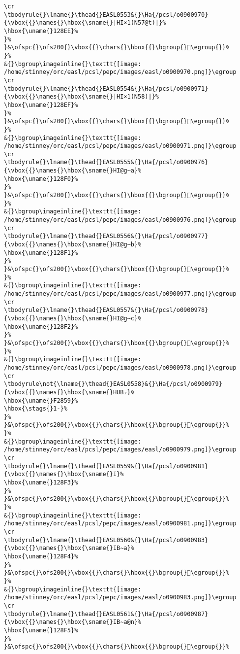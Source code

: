 \begin{verbatim}
\cr
\tbodyrule{}\lname{}\thead{}EASL0553&{}\Ha{/pcsl/o0900970}{\vbox{{}\names{}\hbox{\sname{}|HI×1(N57@t)|}%
\hbox{\uname{}128EE}%
}%
}&\ofspc{}\ofs200{}\vbox{{}\chars{}\hbox{{}\bgroup{}𒣮\egroup{}}%
}%
&{}\bgroup\imageinline{}\texttt{[image: /home/stinney/orc/easl/pcsl/pepc/images/easl/o0900970.png]}\egroup
\cr
\tbodyrule{}\lname{}\thead{}EASL0554&{}\Ha{/pcsl/o0900971}{\vbox{{}\names{}\hbox{\sname{}|HI×1(N58)|}%
\hbox{\uname{}128EF}%
}%
}&\ofspc{}\ofs200{}\vbox{{}\chars{}\hbox{{}\bgroup{}𒣯\egroup{}}%
}%
&{}\bgroup\imageinline{}\texttt{[image: /home/stinney/orc/easl/pcsl/pepc/images/easl/o0900971.png]}\egroup
\cr
\tbodyrule{}\lname{}\thead{}EASL0555&{}\Ha{/pcsl/o0900976}{\vbox{{}\names{}\hbox{\sname{}HI@g∼a}%
\hbox{\uname{}128F0}%
}%
}&\ofspc{}\ofs200{}\vbox{{}\chars{}\hbox{{}\bgroup{}𒣰\egroup{}}%
}%
&{}\bgroup\imageinline{}\texttt{[image: /home/stinney/orc/easl/pcsl/pepc/images/easl/o0900976.png]}\egroup
\cr
\tbodyrule{}\lname{}\thead{}EASL0556&{}\Ha{/pcsl/o0900977}{\vbox{{}\names{}\hbox{\sname{}HI@g∼b}%
\hbox{\uname{}128F1}%
}%
}&\ofspc{}\ofs200{}\vbox{{}\chars{}\hbox{{}\bgroup{}𒣱\egroup{}}%
}%
&{}\bgroup\imageinline{}\texttt{[image: /home/stinney/orc/easl/pcsl/pepc/images/easl/o0900977.png]}\egroup
\cr
\tbodyrule{}\lname{}\thead{}EASL0557&{}\Ha{/pcsl/o0900978}{\vbox{{}\names{}\hbox{\sname{}HI@g∼c}%
\hbox{\uname{}128F2}%
}%
}&\ofspc{}\ofs200{}\vbox{{}\chars{}\hbox{{}\bgroup{}𒣲\egroup{}}%
}%
&{}\bgroup\imageinline{}\texttt{[image: /home/stinney/orc/easl/pcsl/pepc/images/easl/o0900978.png]}\egroup
\cr
\tbodyrule\not{\lname{}\thead{}EASL0558}&{}\Ha{/pcsl/o0900979}{\vbox{{}\names{}\hbox{\sname{}HUB₂}%
\hbox{\uname{}F2859}%
\hbox{\stags{}1-}%
}%
}&\ofspc{}\ofs200{}\vbox{{}\chars{}\hbox{{}\bgroup{}󲡙\egroup{}}%
}%
&{}\bgroup\imageinline{}\texttt{[image: /home/stinney/orc/easl/pcsl/pepc/images/easl/o0900979.png]}\egroup
\cr
\tbodyrule{}\lname{}\thead{}EASL0559&{}\Ha{/pcsl/o0900981}{\vbox{{}\names{}\hbox{\sname{}I}%
\hbox{\uname{}128F3}%
}%
}&\ofspc{}\ofs200{}\vbox{{}\chars{}\hbox{{}\bgroup{}𒣳\egroup{}}%
}%
&{}\bgroup\imageinline{}\texttt{[image: /home/stinney/orc/easl/pcsl/pepc/images/easl/o0900981.png]}\egroup
\cr
\tbodyrule{}\lname{}\thead{}EASL0560&{}\Ha{/pcsl/o0900983}{\vbox{{}\names{}\hbox{\sname{}IB∼a}%
\hbox{\uname{}128F4}%
}%
}&\ofspc{}\ofs200{}\vbox{{}\chars{}\hbox{{}\bgroup{}𒣴\egroup{}}%
}%
&{}\bgroup\imageinline{}\texttt{[image: /home/stinney/orc/easl/pcsl/pepc/images/easl/o0900983.png]}\egroup
\cr
\tbodyrule{}\lname{}\thead{}EASL0561&{}\Ha{/pcsl/o0900987}{\vbox{{}\names{}\hbox{\sname{}IB∼a@n}%
\hbox{\uname{}128F5}%
}%
}&\ofspc{}\ofs200{}\vbox{{}\chars{}\hbox{{}\bgroup{}𒣵\egroup{}}%

\end{verbatim}
